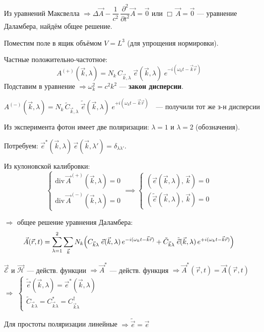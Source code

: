 Из уравнений Максвелла $\Rightarrow \Delta\vec{A} - \dfrac{1}{c^2}\,\dfrac{\partial^2}{\partial t^2}\vec{A} = \vec{0}$ \quad или \quad $\Box\,\vec{A} = \vec{0}$ \quad --- уравнение Даламбера, найдём общее решение.

Поместим поле в ящик объёмом $V = L^3$ (для упрощения нормировки).

Частные положительно-частотное:
\[
A^{(+)}(\vec{k},\lambda) = N_k\,C_{\vec{k},\lambda}\;{\vec{e}(\vec{k},\lambda)}\;e^{-i(\omega_k t - \vec{k}\vec{r})}
\]
Подставим в уравнение $\Rightarrow \omega_k^2 = c^2 k^2$ --- \textbf{закон дисперсии}.

\[
A^{(-)}(\vec{k},\lambda) = N_k\,\tilde{C}_{\vec{k},\lambda}\;\tilde{\vec{e}}(\vec{k},\lambda)\;e^{+i(\omega_k t - \vec{k}\vec{r})} \quad\text{--- получили тот же з-н дисперсии}
\]

Из эксперимента фотон имеет две поляризации: $\lambda = 1$ и $\lambda = 2$ (обозначения).

Потребуем: $\vec{e}^*(\vec{k},\lambda)\,\vec{e}(\vec{k},\lambda') = \delta_{\lambda\lambda'}$.

Из кулоновской калибровки:
\[
\begin{cases}
	\mathrm{div}\,\vec{A}^{(+)}(\vec{k},\lambda) = 0\\
	\mathrm{div}\,\vec{A}^{(-)}(\vec{k},\lambda) = 0
\end{cases}
\implies
\begin{cases}
	(\vec{e}(\vec{k},\lambda),\,\vec{k}) = 0\\
	(\tilde{\vec{e}}(\vec{k},\lambda),\,\vec{k}) = 0
\end{cases}
\]

$\Rightarrow$ общее решение уравнения Даламбера:
\[
\vec{A}(\vec{r},t) = \sum_{\lambda=1}^{2}\sum_{\vec{k}} N_k\Bigl(C_{\vec{k}\lambda}\;\vec{e}(\vec{k},\lambda)\,e^{-i(\omega_k t - \vec{k}\vec{r})} + \tilde{C}_{\vec{k}\lambda}\;\tilde{\vec{e}}(\vec{k},\lambda)\,e^{+i(\omega_k t - \vec{k}\vec{r})}\Bigr)
\]

$\vec{\mathcal{E}}$ и $\vec{\mathcal{H}}$ --- действ. функции $\Rightarrow \vec{A}^*$ --- действ. функция $\Rightarrow \vec{A}^*(\vec{r},t) = \vec{A}(\vec{r},t)$
$\Rightarrow$
$\begin{cases}
	\tilde{\vec{e}}(\vec{k},\lambda) = \vec{e}^*(\vec{k},\lambda)\\[4pt]
	\tilde{C}_{\vec{k}\lambda} = C_{\vec{k}\lambda}^* = C_{\vec{k}\lambda}^\dagger
\end{cases}$

Для простоты поляризации линейные $\Rightarrow \tilde{\vec{e}} = \vec{e}$


